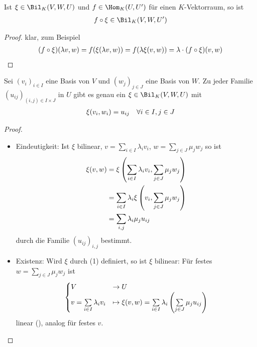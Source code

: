 \begin{lemma}
	Ist $\xi\in\Bil_K(V,W,U)$ und $f\in\Hom_K(U,U')$ für einen $K$-Vektorraum, so ist 
	\begin{align}
		f\circ \xi\in\Bil_K(V,W,U')\notag
	\end{align}
\end{lemma}
\begin{proof}
	klar, zum Beispiel
	\begin{align}
		(f\circ\xi)(\lambda v,w)=f(\xi(\lambda v,w))=f(\lambda\xi(v,w))=\lambda\cdot(f\circ\xi)(v,w)\notag
	\end{align}
\end{proof}

\begin{lemma}
	Sei $(v_i)_{i\in I}$ eine Basis von $V$ und $(w_j)_{j\in J}$ eine Basis von $W$. Zu jeder Familie $(u_{ij})_{(i,j)\in I\times J}$ in $U$ gibt es genau ein $\xi\in\Bil_K(V,W,U)$ mit
	\begin{align}
		\xi(v_i,w_i)=u_{ij}\quad\forall i\in I, j\in J\notag
	\end{align}
\end{lemma}
\begin{proof}
	\begin{itemize}
		\item Eindeutigkeit: Ist $\xi$ bilinear, $v=\sum_{i\in I} \lambda_i v_i$, $w=\sum_{j\in J} \mu_j w_j$ so ist 
		\begin{align}
			\xi(v,w)&=\xi\left(\sum_{i\in I} \lambda_i v_i,\sum_{j\in J}\mu_j w_j\right) \notag \\
			&= \sum_{i\in I}\lambda_i\xi\left(v_i,\sum_{j\in J}\mu_j w_j\right)\notag \\
			&= \sum_{i,j}\lambda_i\mu_j u_{ij}
		\end{align}
		durch die Familie $(u_{ij})_{i,j}$ bestimmt.
		\item Existenz: Wird $\xi$ durch (1) definiert, so ist $\xi$ bilinear: Für festes $w=\sum_{j\in J}\mu_j w_j$ ist
		\begin{align}
			\begin{cases}
			V&\to U \\ v=\sum\limits_{i\in I}\lambda_i v_i&\mapsto \xi(v,w)=\sum\limits_{i\in I}\lambda_i\left(\sum\limits_{j\in J}\mu_j u_{ij}\right)
			\end{cases}\notag
		\end{align}
		linear (), analog für festes $v$.
	\end{itemize}
\end{proof}

